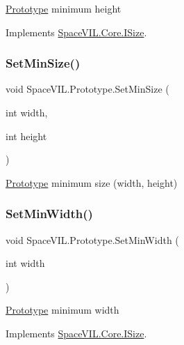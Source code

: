 \mbox{\hyperlink{class_space_v_i_l_1_1_prototype}{Prototype}} minimum height 



Implements \mbox{\hyperlink{interface_space_v_i_l_1_1_core_1_1_i_size}{Space\+V\+I\+L.\+Core.\+I\+Size}}.

\mbox{\label{class_space_v_i_l_1_1_prototype_a799cc25e25e57ca5b89d488a38cd8063}} 
\subsubsection{\texorpdfstring{Set\+Min\+Size()}{SetMinSize()}}
{\footnotesize\ttfamily void Space\+V\+I\+L.\+Prototype.\+Set\+Min\+Size (\begin{DoxyParamCaption}\item[{int}]{width,  }\item[{int}]{height }\end{DoxyParamCaption})}



\mbox{\hyperlink{class_space_v_i_l_1_1_prototype}{Prototype}} minimum size (width, height) 

\mbox{\label{class_space_v_i_l_1_1_prototype_a9594f8484683ec450e8ce20b0c5fad1c}} 
\subsubsection{\texorpdfstring{Set\+Min\+Width()}{SetMinWidth()}}
{\footnotesize\ttfamily void Space\+V\+I\+L.\+Prototype.\+Set\+Min\+Width (\begin{DoxyParamCaption}\item[{int}]{width }\end{DoxyParamCaption})}



\mbox{\hyperlink{class_space_v_i_l_1_1_prototype}{Prototype}} minimum width 



Implements \mbox{\hyperlink{interface_space_v_i_l_1_1_core_1_1_i_size}{Space\+V\+I\+L.\+Core.\+I\+Size}}.

